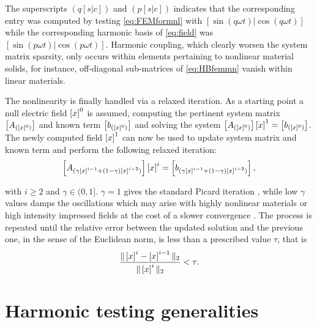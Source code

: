 \noindent The superscripts $(q[s|c])$ and $(p[s|c])$ indicates that the corresponding
entry was computed by testing \eqref{eq:FEMformnl} with $[\sin(q \omega t) | \cos(q \omega t)]$ while the corresponding harmonic basis of \eqref{eq:field}
was $[\sin(p \omega t) | \cos(p \omega t)]$. Harmonic coupling, which clearly worsen the system matrix sparsity, only occurs within elements pertaining to nonlinear material solids, for instance, off-diagonal sub-matrices of \eqref{eq:HBfemmn} vanish within linear materials.

The nonlinearity is finally handled via a relaxed iteration. As a starting point a null electric field $\left[{{x}}\right]^0$ is assumed, computing the pertinent system matrix $\left[A_{([x]^0)}\right]$ and known term $\left[{{b_{([x]^0)}}}\right]$ and solving the system $\left[A_{([x]^0)}\right] \left[{{x}}\right]^1 = \left[{{b_{([x]^0)}}}\right]$. The newly computed field $\left[{{x}}\right]^1$ can now be used to update system matrix and known term and perform the following relaxed iteration:
\begin{equation} \label{eq:lastLinearSystem}
 \left[A_{(\gamma \left[{{x}}\right]^{i-1} + (1-\gamma) \left[{{x}}\right]^{i-2})}\right] \left[{{x}}\right]^{i} = \left[{{b_{(\gamma \left[{{x}}\right]^{i-1} + (1-\gamma) \left[{{x}}\right]^{i-2})}}}\right],
\end{equation}

\noindent with $i \geq 2$ and $\gamma\in(0,1]$. $\gamma=1$ gives the standard Picard iteration \cite{Guarnieri2010}, while low $\gamma$ values damps the oscillations
which may arise with highly nonlinear materials or high intensity impressed
fields at the cost of a slower convergence \cite{Silvester1997}. The process 
is repeated until the relative error between the updated solution
and the previous one, in the sense of the Euclidean norm, is less than a
prescribed value $\tau$, that is
$$ \frac{\Vert\left[{{x}}\right]^{i}-\left[{{x}}\right]^{i-1} \Vert_2}{\Vert\left[{{x}}\right]^{i}\Vert_2} < \tau.$$

\section{Harmonic testing generalities}

